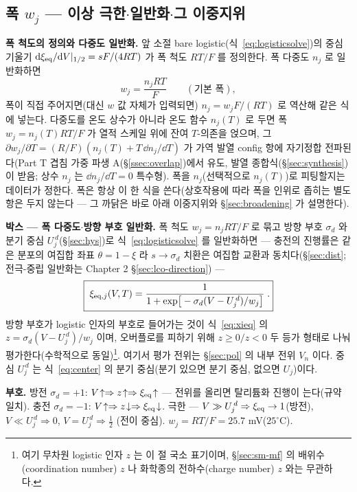 \subsection{폭 $w_j$ --- 이상 극한$\cdot$일반화$\cdot$그 이중지위}\label{sec:width-w}
\textbf{폭 척도의 정의와 다중도 일반화.} 앞 소절 bare logistic(식~\eqref{eq:logisticsolve})의 중심 기울기
$\mathrm{d}\xi_{\mathrm{eq}}/\mathrm{d} V|_{1/2}=sF/(4RT)$ 가 폭 척도 $RT/F$ 를 정의한다. 폭 다중도 $n_j$ 로 일반화하면
\begin{equation}
w_j=\frac{n_jRT}{F}\qquad(\text{기본 폭}),
\label{eq:wbase}
\end{equation}
폭이 직접 주어지면(대신 $w$ 값 자체가 입력되면) $n_j=w_jF/(RT)$ 로 역산해 같은 식에 넣는다.
다중도를 온도 상수가 아니라 온도 함수 $n_j(T)$ 로 두면 폭 $w_j=n_j(T)RT/F$ 가 열적 스케일 위에 잔여 $T$-의존을
얹으며, 그 $\partial w_j/\partial T=(R/F)(n_j(T)+T\,\dd n_j/\dd T)$ 가 가역 발열 config 항에 자기정합 전파된다(Part T
겹침 가중 파생 A(\S\ref{ssec:overlap})에서 유도, 발열 종합식(\S\ref{sec:synthesis})이 받음; 상수 $n_j$ 는 $\dd n_j/\dd T{=}0$ 특수형). 폭을 $n_j$(선택적으로 $n_j(T)$)로 피팅할지는 데이터가 정한다.
폭은 항상 이 한 식을 쓴다(상호작용에 따라 폭을 인위로 좁히는 별도 항은 두지 않는다 --- 그 까닭은 바로 아래
이중지위와 \S\ref{sec:broadening} 가 설명한다).

\textbf{박스 --- 폭 다중도$\cdot$방향 부호 일반화.} 폭 척도 $w_j=n_jRT/F$ 로 묶고 방향 부호 $\sigma_d$ 와 분기
중심 $U_j^{\,d}$(\S\ref{sec:hys})로 식~\eqref{eq:logisticsolve} 를 일반화하면 --- 충전의 진행률은 같은 분포의
여집합 좌표 $\theta=1-\xi$ 라 $s\to\sigma_d$ 치환은 여집합 교환과 동치다(\S\ref{sec:dist}; 전극-중립
일반화는 Chapter 2 \S\ref{sec:lco-direction}) ---
\begin{equation}
\boxed{\;\xi_{\mathrm{eq},j}(V,T)=\frac{1}{1+\exp\!\big[-\sigma_d(V-U_j^{\,d})/w_j\big]}\;.}
\label{eq:xieq}
\end{equation}
방향 부호가 logistic 인자의 부호로 들어가는 것이 식~\eqref{eq:xieq} 의 $z=\sigma_d(V-U_j^{\,d})/w_j$ 이며,
오버플로를 피하기 위해 $z\ge0/z<0$ 두 등가 형태로 나눠 평가한다(수학적으로
동일)\footnote{여기 무차원 logistic 인자 $z$ 는 이 절 국소 표기이며, \S\ref{sec:sm-mf} 의 배위수(coordination
number) $z$ 나 화학종의 전하수(charge number) $z$ 와는 무관하다.}. 여기서 평가 전위는 \S\ref{sec:pol} 의 내부 전위 $V_n$ 이다. 중심 $U_j^{\,d}$
는 식~\eqref{eq:center} 의 분기 중심(분기 있으면 분기 중심, 없으면 $U_j$)이다.

\begin{signbox}
\textbf{부호.} 방전 $\sigma_d=+1$: $V\!\uparrow\Rightarrow z\!\uparrow\Rightarrow\xi_{\mathrm{eq}}\!\uparrow$ --- 전위를 올리면
탈리튬화 진행이 는다(규약 일치). 충전 $\sigma_d=-1$: $V\!\uparrow\Rightarrow z\!\downarrow\Rightarrow\xi_{\mathrm{eq}}\!\downarrow$.
극한 --- $V\gg U_j^{\,d}\Rightarrow\xi_{\mathrm{eq}}\to1$(방전), $V\ll U_j^{\,d}\Rightarrow0$, $V=U_j^{\,d}\Rightarrow\tfrac12$
(전이 중심). $w_j=RT/F=25.7$ mV($25^\circ$C).
\end{signbox}


